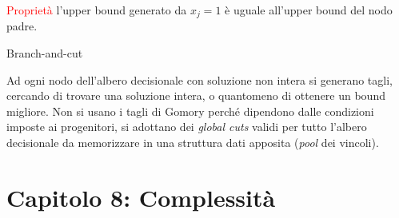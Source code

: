 \documentclass[answers, a4paper, 11pt]{exam}
\begin{document}
\begin{questions}
\begin{solution}
\textcolor{red}{Proprietà} l'upper bound generato da $x_{j} = 1$ è uguale all'upper bound del nodo padre.
\end{solution}
\question Branch-and-cut
\begin{solution}
Ad ogni nodo dell'albero decisionale con soluzione non intera si generano tagli, cercando di trovare una soluzione intera, o quantomeno di ottenere un bound migliore. Non si usano i tagli di Gomory perché dipendono dalle condizioni imposte ai progenitori, si adottano dei \emph{global cuts} validi per tutto l'albero decisionale da memorizzare in una struttura dati apposita (\emph{pool} dei vincoli).
\end{solution}
\end{questions}

\section{Capitolo 8: Complessità}
\end{document}
